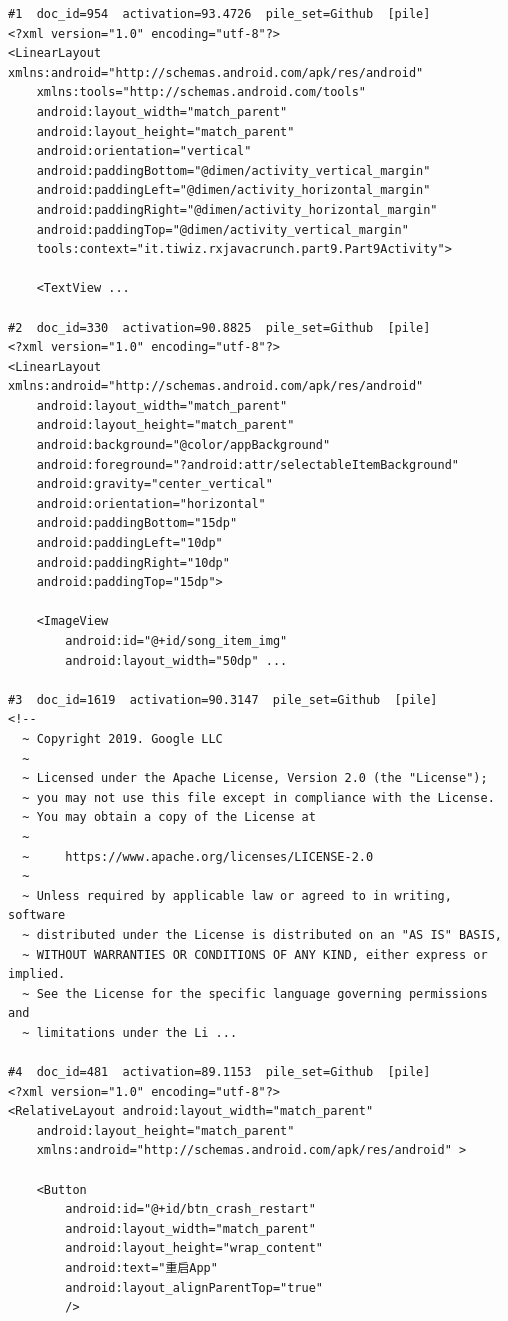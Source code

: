 \begin{verbatim}
#1  doc_id=954  activation=93.4726  pile_set=Github  [pile]
<?xml version="1.0" encoding="utf-8"?>
<LinearLayout xmlns:android="http://schemas.android.com/apk/res/android"
    xmlns:tools="http://schemas.android.com/tools"
    android:layout_width="match_parent"
    android:layout_height="match_parent"
    android:orientation="vertical"
    android:paddingBottom="@dimen/activity_vertical_margin"
    android:paddingLeft="@dimen/activity_horizontal_margin"
    android:paddingRight="@dimen/activity_horizontal_margin"
    android:paddingTop="@dimen/activity_vertical_margin"
    tools:context="it.tiwiz.rxjavacrunch.part9.Part9Activity">

    <TextView ...

#2  doc_id=330  activation=90.8825  pile_set=Github  [pile]
<?xml version="1.0" encoding="utf-8"?>
<LinearLayout xmlns:android="http://schemas.android.com/apk/res/android"
    android:layout_width="match_parent"
    android:layout_height="match_parent"
    android:background="@color/appBackground"
    android:foreground="?android:attr/selectableItemBackground"
    android:gravity="center_vertical"
    android:orientation="horizontal"
    android:paddingBottom="15dp"
    android:paddingLeft="10dp"
    android:paddingRight="10dp"
    android:paddingTop="15dp">

    <ImageView
        android:id="@+id/song_item_img"
        android:layout_width="50dp" ...

#3  doc_id=1619  activation=90.3147  pile_set=Github  [pile]
<!--
  ~ Copyright 2019. Google LLC
  ~
  ~ Licensed under the Apache License, Version 2.0 (the "License");
  ~ you may not use this file except in compliance with the License.
  ~ You may obtain a copy of the License at
  ~
  ~     https://www.apache.org/licenses/LICENSE-2.0
  ~
  ~ Unless required by applicable law or agreed to in writing, software
  ~ distributed under the License is distributed on an "AS IS" BASIS,
  ~ WITHOUT WARRANTIES OR CONDITIONS OF ANY KIND, either express or implied.
  ~ See the License for the specific language governing permissions and
  ~ limitations under the Li ...

#4  doc_id=481  activation=89.1153  pile_set=Github  [pile]
<?xml version="1.0" encoding="utf-8"?>
<RelativeLayout android:layout_width="match_parent"
    android:layout_height="match_parent"
    xmlns:android="http://schemas.android.com/apk/res/android" >

    <Button
        android:id="@+id/btn_crash_restart"
        android:layout_width="match_parent"
        android:layout_height="wrap_content"
        android:text="重启App"
        android:layout_alignParentTop="true"
        />


\end{verbatim}
